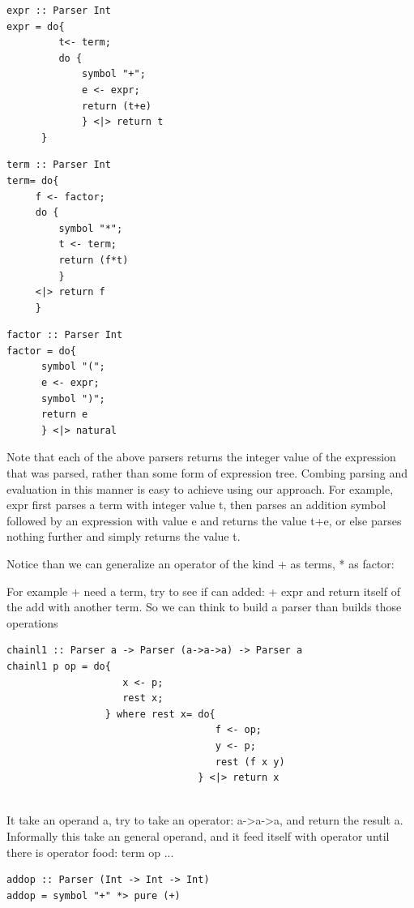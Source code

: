 \documentclass[a4papert]{article}
\begin{document}
\begin{lstlisting}[style=haskellstyle]
expr :: Parser Int
expr = do{
         t<- term;
         do {
             symbol "+";
             e <- expr;
             return (t+e)
             } <|> return t
      }
\end{lstlisting}


\begin{lstlisting}[style=haskellstyle]
term :: Parser Int
term= do{
     f <- factor;
     do {
         symbol "*";
         t <- term;
         return (f*t)
         }
     <|> return f
     }
\end{lstlisting}


\begin{lstlisting}[style=haskellstyle]
factor :: Parser Int
factor = do{
      symbol "(";
      e <- expr;
      symbol ")";
      return e
      } <|> natural
\end{lstlisting}


Note that each of the above parsers returns the integer value of the expression that was parsed, rather than some form of expression tree. Combing parsing and evaluation in this manner is easy to achieve using our approach. For example, expr first parses a term with integer value t, then parses an addition symbol followed by an expression with value e and returns the value t+e, or else parses nothing further and simply returns the value t.

Notice than we can generalize an operator of the kind + as terms, * as factor:

For example + need a term, try to see if can added: + expr and return itself of the add with another term. So we can think to build a parser than builds those operations

\begin{lstlisting}[style=haskellstyle]
chainl1 :: Parser a -> Parser (a->a->a) -> Parser a
chainl1 p op = do{
                    x <- p;
                    rest x;
                 } where rest x= do{
                                    f <- op;
                                    y <- p;
                                    rest (f x y)
                                 } <|> return x


\end{lstlisting}
It take an operand a, try to take an operator: a->a->a, and return the result a. Informally this take an general operand, and it feed itself with operator until there is operator food: term op ...


\begin{lstlisting}[style=haskellstyle]
addop :: Parser (Int -> Int -> Int)
addop = symbol "+" *> pure (+)
\end{lstlisting}
\end{document}
